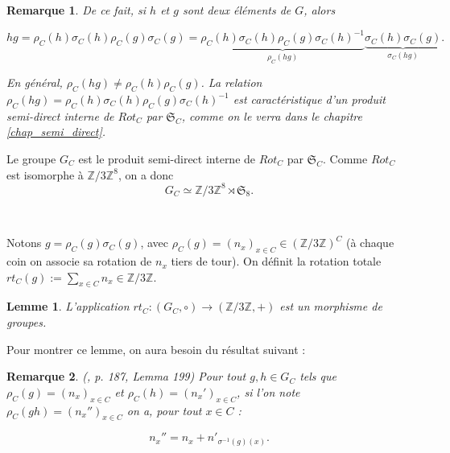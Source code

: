 \documentclass[french]{report}
\newtheorem*{remark}{Remarque}
\newtheorem*{lemma}{Lemme}
\begin{document}
\begin{remark}\label{semi-direct}
  De ce fait, si $h$ et $g$ sont deux éléments de $G$, alors

  \begin{equation*}
    hg = \rho_C(h) \sigma_C(h) \rho_C(g) \sigma_C(g) = \underbrace{\rho_C(h) \sigma_C(h) \rho_C(g) \sigma_C(h) ^{-1} }_{\rho_C(hg)} \underbrace{\sigma_C(h) \sigma_C(g)}_{\sigma_C(hg)}.
  \end{equation*}

En général, $\rho_C(hg) \neq \rho_C(h) \rho_C(g)$. La relation $\rho_C(hg) = \rho_C(h) \sigma_C(h) \rho_C(g) \sigma_C(h) ^{-1}$ est caractéristique d'un produit semi-direct interne de $Rot_C$ par $\mathfrak{S}_{C} $, comme on le verra dans le chapitre \ref{chap_semi_direct}.
\end{remark}

Le groupe $G_C$ est le produit semi-direct interne de $Rot_C$ par $\mathfrak{S}_{C} $. Comme $Rot_C$ est isomorphe à $\mathbb{Z}/{ 3 }\mathbb{Z} ^{8}$, on a donc $$ G_C \simeq \mathbb{Z}/{ 3 }\mathbb{Z} ^{8} \rtimes \mathfrak{S}_{8}.$$


\

Notons $g = \rho_C(g) \sigma_C(g)$, avec $\rho_C(g) = (n_x) _{x \in C} \in (\mathbb{Z}/{ 3 }\mathbb{Z}) ^{C}$ (à chaque coin on associe sa rotation de $n_x$ tiers de tour). On définit la rotation totale $rt_C(g) := \sum_{x \in C}n_x \in \mathbb{Z}/{ 3 }\mathbb{Z} $.

\begin{lemma}
L'application  $rt_C : (G_C, \circ) \to (\mathbb{Z}/{ 3 }\mathbb{Z}, +)$ est un morphisme de groupes.
\end{lemma}



Pour montrer ce lemme, on aura besoin du résultat suivant :

\begin{remark} \label{composition_rotations}(\cite{math_rubik}, p. 187, Lemma 199)
  Pour tout $g, h \in G_C$ tels que $\rho_C(g) = (n_x) _{x \in C}$ et $\rho_C(h) = (n_x') _{ x \in C}$, si l'on note $\rho_C(gh) = (n_x'') _{x \in C}$ on a, pour tout $x \in C$ :

  $$ n_x'' = n_x + n' _{ \sigma ^{-1}(g)(x)}.$$
\end{remark}
\end{document}
